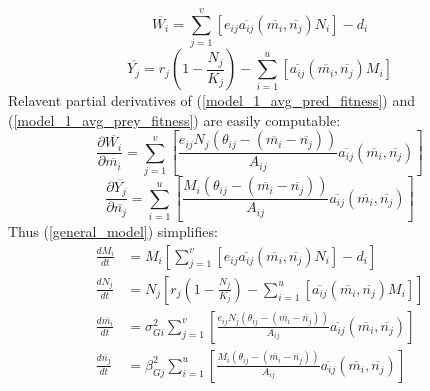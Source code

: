 \documentclass{amsart}
\theoremstyle{definition}
\theoremstyle{remark}
\numberwithin{equation}{section}
\begin{document}
\begin{equation}
	\label{model_1_avg_pred_fitness}
	\overline{W_i} = \sum\limits_{j = 1}^{v}\left[e_{ij}\overline{a_{ij}}(\overline{m_i}, \overline{n_j})N_i\right] - d_i
\end{equation}
\begin{equation}
	\label{model_1_avg_prey_fitness}
	\overline{Y_j} = r_j\left(1 - \frac{N_j}{K_j}\right) - \sum\limits_{i = 1}^{u}\left[\overline{a_{ij}}(\overline{m_i}, \overline{n_j})M_i\right]
\end{equation}
Relavent partial derivatives of (\ref{model_1_avg_pred_fitness}) and (\ref{model_1_avg_prey_fitness}) are easily computable:
\begin{equation}
	\label{model_1_pred_fitness_partial}
	\frac{\partial \overline{W_i}}{\partial \overline{m_i}} = \sum\limits_{j = 1}^{v}\left[\frac{e_{ij}N_j(\theta_{ij} - (\overline{m_i} - \overline{n_j}))}{A_{ij}}\overline{a_{ij}}(\overline{m_i}, \overline{n_j})\right]
\end{equation}
\begin{equation}
	\label{model_1_prey_fitness_partial}
	\frac{\partial \overline{Y_j}}{\partial \overline{n_j}} = \sum\limits_{i = 1}^{u}\left[\frac{M_i(\theta_{ij} - (\overline{m_i} - \overline{n_j}))}{A_{ij}}\overline{a_{ij}}(\overline{m_i}, \overline{n_j})\right]
\end{equation}
Thus (\ref{general_model}) simplifies:
\begin{subequations}
	\label{model1}
	\begin{align}
		\label{eq:model1_a}
		\frac{dM_i}{dt} &= M_i\left[\sum\limits_{j = 1}^{v}\left[e_{ij}\overline{a_{ij}}(\overline{m_i}, \overline{n_j})N_i\right] - d_i\right] \\[5px]
		\label{eq:model1_b}
		\frac{dN_j}{dt} &= N_j\left[r_j\left(1 - \frac{N_j}{K_j}\right) - \sum\limits_{i = 1}^{u}\left[\overline{a_{ij}}(\overline{m_i}, \overline{n_j})M_i\right]\right] \\[5px]
		\label{eq:model1_c}
		\frac{d\overline{m_i}}{dt} &= \sigma_{Gi}^2\sum\limits_{j = 1}^{v}\left[\frac{e_{ij}N_j(\theta_{ij} - (\overline{m_i} - \overline{n_j}))}{A_{ij}}\overline{a_{ij}}(\overline{m_i}, \overline{n_j})\right] \\[5px]
		\label{eq:model1_d}
		\frac{d\overline{n_j}}{dt} &= \beta_{Gj}^2\sum\limits_{i = 1}^{u}\left[\frac{M_i(\theta_{ij} - (\overline{m_i} - \overline{n_j}))}{A_{ij}}\overline{a_{ij}}(\overline{m_i}, \overline{n_j})\right]
	\end{align}
\end{subequations}
\end{document}
